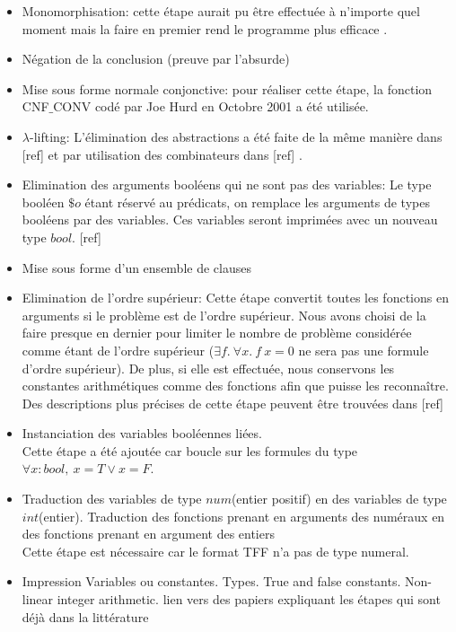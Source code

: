 \begin{itemize}    
  \item Monomorphisation: cette étape aurait pu \^etre effectuée à n'importe quel moment mais la faire en premier rend le programme plus efficace \cite{MengP08}.
  \item Négation de la conclusion (preuve par l'absurde)
  \item Mise sous forme normale conjonctive: pour réaliser cette étape, la fonction \textsf{CNF$\_$CONV} codé par Joe Hurd en Octobre 2001 a été utilisée.
  \item $\lambda$-lifting: L'élimination des abstractions a été faite de la m\^eme manière dans [ref] et par utilisation des combinateurs dans [ref]  . 
  \item Elimination des arguments booléens qui ne sont pas des variables:
  Le type booléen $\$o$ étant réservé au prédicats, on remplace les arguments de types booléens par des variables. Ces variables seront imprimées avec un nouveau type $bool$.
  [ref]   
  \item Mise sous forme d'un ensemble de clauses     
  \item Elimination de l'ordre supérieur: Cette étape convertit toutes les fonctions en arguments si le problème est de l'ordre supérieur. Nous avons choisi de la faire presque en dernier pour limiter le nombre de problème considérée comme étant de l'ordre supérieur ($\exists f.\ \forall x.\ f\ x = 0$ ne sera pas une formule d'ordre supérieur). De plus, si elle est effectuée, nous conservons les constantes arithmétiques comme des fonctions afin que \beagle puisse les reconna\^itre. Des descriptions plus précises de cette étape peuvent \^etre trouvées dans [ref]

  \item Instanciation des variables booléennes liées.
  \\Cette étape a été ajoutée car \beagle boucle sur les formules du type $\forall x:bool,\ x = T \vee x = F$.
  \item Traduction des variables de type $num$(entier positif) en des variables de type $int$(entier). Traduction des fonctions prenant en arguments des numéraux en des fonctions prenant en argument des entiers
  \\Cette étape est nécessaire car le format TFF n'a pas de type numeral.
\end{itemize}  


\begin{itemize}
    \item Impression
    \subitem Variables ou constantes.  
    \subitem Types.
    \subitem True and false constants.
    \subitem Non-linear integer arithmetic.
lien vers des papiers expliquant les étapes qui sont déjà dans la
  littérature
\end{itemize}  

